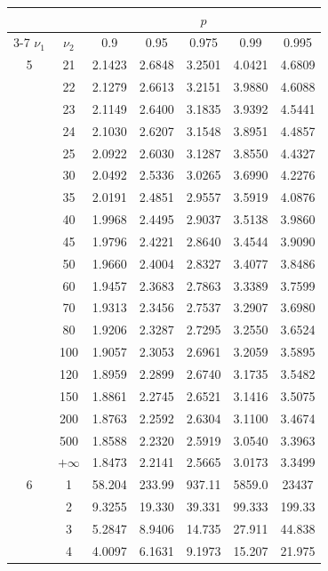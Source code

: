\newpage
\noindent
\begin{minipage}{0.49\textwidth}
	\begin{center}
		\begin{tabular}{ccccccc}
			& & \multicolumn{5}{c}{$p$}\\
			\cline{3-7}
			$\nu_1$ & $\nu_2$ & 0.9 & 0.95 & 0.975 & 0.99 & 0.995 \\
			\midrule
			5 & 21 & 2.1423 & 2.6848 & 3.2501 & 4.0421 & 4.6809 \\
			& 22 & 2.1279 & 2.6613 & 3.2151 & 3.9880 & 4.6088 \\
			& 23 & 2.1149 & 2.6400 & 3.1835 & 3.9392 & 4.5441 \\
			& 24 & 2.1030 & 2.6207 & 3.1548 & 3.8951 & 4.4857 \\
			& 25 & 2.0922 & 2.6030 & 3.1287 & 3.8550 & 4.4327 \\
			& 30 & 2.0492 & 2.5336 & 3.0265 & 3.6990 & 4.2276 \\
			& 35 & 2.0191 & 2.4851 & 2.9557 & 3.5919 & 4.0876 \\
			& 40 & 1.9968 & 2.4495 & 2.9037 & 3.5138 & 3.9860 \\
			& 45 & 1.9796 & 2.4221 & 2.8640 & 3.4544 & 3.9090 \\[5pt]
			& 50 & 1.9660 & 2.4004 & 2.8327 & 3.4077 & 3.8486 \\
			& 60 & 1.9457 & 2.3683 & 2.7863 & 3.3389 & 3.7599 \\
			& 70 & 1.9313 & 2.3456 & 2.7537 & 3.2907 & 3.6980 \\
			& 80 & 1.9206 & 2.3287 & 2.7295 & 3.2550 & 3.6524 \\
			& 100 & 1.9057 & 2.3053 & 2.6961 & 3.2059 & 3.5895 \\
			& 120 & 1.8959 & 2.2899 & 2.6740 & 3.1735 & 3.5482 \\
			& 150 & 1.8861 & 2.2745 & 2.6521 & 3.1416 & 3.5075 \\
			& 200 & 1.8763 & 2.2592 & 2.6304 & 3.1100 & 3.4674 \\
			& 500 & 1.8588 & 2.2320 & 2.5919 & 3.0540 & 3.3963 \\
			& $+\infty$ & 1.8473 & 2.2141 & 2.5665 & 3.0173 & 3.3499 \\
			\midrule
			6 & 1 & 58.204 & 233.99 & 937.11 & 5859.0 & 23437 \\
			& 2 & 9.3255 & 19.330 & 39.331 & 99.333 & 199.33 \\
			& 3 & 5.2847 & 8.9406 & 14.735 & 27.911 & 44.838 \\
			& 4 & 4.0097 & 6.1631 & 9.1973 & 15.207 & 21.975 \\

\end{tabular}
\end{center}
\end{minipage}
